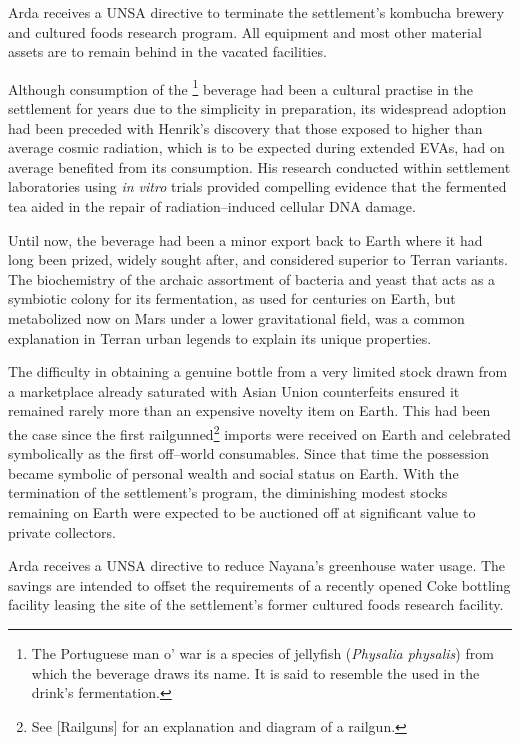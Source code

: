 Arda receives a UNSA directive to terminate the settlement's kombucha brewery and cultured foods research program. All equipment and most other material assets are to remain behind in the vacated facilities. 

Although consumption of the \footnote{The Portuguese man o' war is a species of jellyfish ({\it Physalia physalis}) from which the beverage draws its name. It is said to resemble the  used in the drink's fermentation.} beverage had been a cultural practise in the settlement for years due to the simplicity in preparation, its widespread adoption had been preceded with Henrik's discovery that those exposed to higher than average cosmic radiation, which is to be expected during extended EVAs, had on average benefited from its consumption. His research conducted within settlement laboratories using {\it in vitro} trials provided compelling evidence that the fermented tea aided in the repair of radiation--induced cellular DNA damage. 

Until now, the beverage had been a minor export back to Earth where it had long been prized, widely sought after, and considered superior to Terran variants. The biochemistry of the archaic assortment of bacteria and yeast that acts as a symbiotic colony for its fermentation, as used for centuries on Earth, but metabolized now on Mars under a lower gravitational field, was a common explanation in Terran urban legends to explain its unique properties.

The difficulty in obtaining a genuine bottle from a very limited stock drawn from a marketplace already saturated with Asian Union counterfeits ensured it remained rarely more than an expensive novelty item on Earth. This had been the case since the first railgunned\footnote{See [Railguns] for an explanation and diagram of a railgun.} imports were received on Earth and celebrated symbolically as the first off--world consumables. Since that time the possession became symbolic of personal wealth and social status on Earth. With the termination of the settlement's program, the diminishing modest stocks remaining on Earth were expected to be auctioned off at significant value to private collectors.
\StopTimelineDate

Arda receives a UNSA directive to reduce Nayana's greenhouse water usage. The savings are intended to offset the requirements of a recently opened Coke bottling facility leasing the site of the settlement's former cultured foods research facility.
\StopTimelineDate

